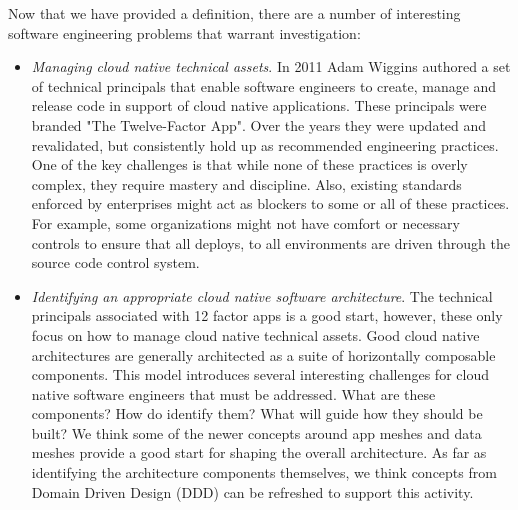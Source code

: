 \documentclass[conference]{IEEEconf}
\begin{document}
\begin{itemize}
	 
\end{itemize} 

Now that we have provided a definition, there are a number of interesting software engineering problems that warrant investigation:

\begin{itemize}
	\item \textit{Managing cloud native technical assets}.  In 2011 Adam Wiggins authored a set of technical principals that enable software engineers to create, manage and release code in support of cloud native applications. These principals were branded "The Twelve-Factor App"\cite{12factor}.  Over the years they were updated and revalidated\cite{hoffman2016beyond, 12factorRevisited}, but consistently hold up as recommended engineering practices. One of the key challenges is that while none of these practices is overly complex, they require mastery and discipline. Also, existing standards enforced by enterprises might act as blockers to some or all of these practices.  For example, some organizations might not have comfort or necessary controls to ensure that all deploys, to all environments are driven through the source code control system.
	
	\item \textit{Identifying an appropriate cloud native software architecture}.  The technical principals associated with 12 factor apps is a good start, however, these only focus on how to manage cloud native technical assets.  Good cloud native architectures are generally architected as a suite of horizontally composable components. This model introduces several interesting challenges for cloud native software engineers that must be addressed. What are these components? How do identify them? What will guide how they should be built? We think some of the newer concepts around app meshes\cite{GartnerMASA} and data meshes\cite{datamesh} provide a good start for shaping the overall architecture.  As far as identifying the architecture components themselves, we think concepts from Domain Driven Design (DDD)\cite{evans2004domain, vernon2013implementing} can be refreshed to support this activity.


\end{itemize}
\end{document}
